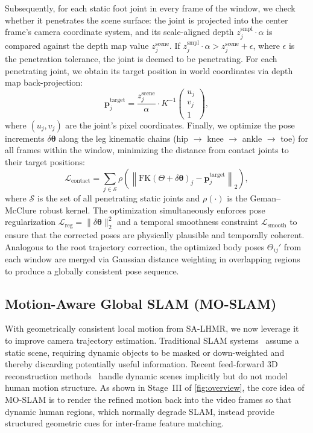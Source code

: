 Subsequently, for each static foot joint in every frame of the window, we check whether it penetrates the scene surface: the joint is projected into the center frame's camera coordinate system, and its scale-aligned depth $z_j^{\text{smpl}} \cdot \alpha$ is compared against the depth map value $z_j^{\text{scene}}$. If $z_j^{\text{smpl}} \cdot \alpha > z_j^{\text{scene}} + \epsilon$, where $\epsilon$ is the penetration tolerance, the joint is deemed to be penetrating. For each penetrating joint, we obtain its target position in world coordinates via depth map back-projection:
%
\begin{equation}
  \mathbf{p}_j^{\text{target}} = \frac{z_j^{\text{scene}}}{\alpha} \cdot K^{-1} \begin{pmatrix} u_j \\ v_j \\ 1 \end{pmatrix}, 
\end{equation}
%
where $(u_j, v_j)$ are the joint's pixel coordinates. Finally, we optimize the pose increments $\delta\boldsymbol{\theta}$ along the leg kinematic chains (hip $\to$ knee $\to$ ankle $\to$ toe) for all frames within the window, minimizing the distance from contact joints to their target positions:
%
\begin{equation}
  \mathcal{L}_{\text{contact}} = \sum_{j \in \mathcal{S}} \rho\!\left(\left\|\text{FK}(\Theta + \delta\boldsymbol{\theta})_j - \mathbf{p}_j^{\text{target}}\right\|_2\right), 
\end{equation}
%
where $\mathcal{S}$ is the set of all penetrating static joints and $\rho(\cdot)$ is the Geman--McClure robust kernel. The optimization simultaneously enforces pose regularization $\mathcal{L}_{\text{reg}} = \|\delta\boldsymbol{\theta}\|_2^2$ and a temporal smoothness constraint $\mathcal{L}_{\text{smooth}}$ to ensure that the corrected poses are physically plausible and temporally coherent. Analogous to the root trajectory correction, the optimized body poses $\Theta_{ij}'$ from each window are merged via Gaussian distance weighting in overlapping regions to produce a globally consistent pose sequence.



\subsection{Motion-Aware Global SLAM (MO-SLAM)}
\label{sec:mo-slam}

With geometrically consistent local motion from SA-LHMR, we now leverage it to improve camera trajectory estimation. Traditional SLAM systems~\cite{ORBSLAM3,DROIDSLAM2021,DPVO2023} assume a static scene, requiring dynamic objects to be masked or down-weighted and thereby discarding potentially useful information. Recent feed-forward 3D reconstruction methods~\cite{DUSt3R2024,MonST3R2024,MASt3RSLAM2025} handle dynamic scenes implicitly but do not model human motion structure. As shown in Stage~III of \cref{fig:overview}, the core idea of MO-SLAM is to render the refined motion back into the video frames so that dynamic human regions, which normally degrade SLAM, instead provide structured geometric cues for inter-frame feature matching.

